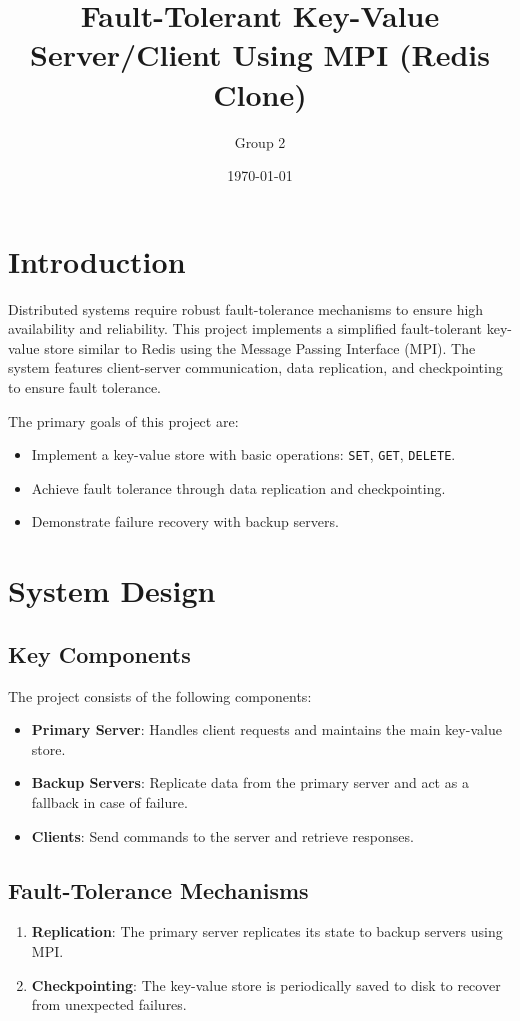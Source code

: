 \documentclass[12pt]{article}
\title{Fault-Tolerant Key-Value Server/Client Using MPI (Redis Clone)}
\author{Group 2}
\date{\today}
\begin{document}
\maketitle

\tableofcontents
\newpage

\section{Introduction}
Distributed systems require robust fault-tolerance mechanisms to ensure high availability and reliability. This project implements a simplified fault-tolerant key-value store similar to Redis using the Message Passing Interface (MPI). The system features client-server communication, data replication, and checkpointing to ensure fault tolerance.

The primary goals of this project are:
\begin{itemize}
    \item Implement a key-value store with basic operations: \texttt{SET}, \texttt{GET}, \texttt{DELETE}.
    \item Achieve fault tolerance through data replication and checkpointing.
    \item Demonstrate failure recovery with backup servers.
\end{itemize}

\section{System Design}

\subsection{Key Components}
The project consists of the following components:
\begin{itemize}
    \item \textbf{Primary Server}: Handles client requests and maintains the main key-value store.
    \item \textbf{Backup Servers}: Replicate data from the primary server and act as a fallback in case of failure.
    \item \textbf{Clients}: Send commands to the server and retrieve responses.
\end{itemize}

\subsection{Fault-Tolerance Mechanisms}
\begin{enumerate}
    \item \textbf{Replication}: The primary server replicates its state to backup servers using MPI.
    \item \textbf{Checkpointing}: The key-value store is periodically saved to disk to recover from unexpected failures.
\end{enumerate}
\end{document}
